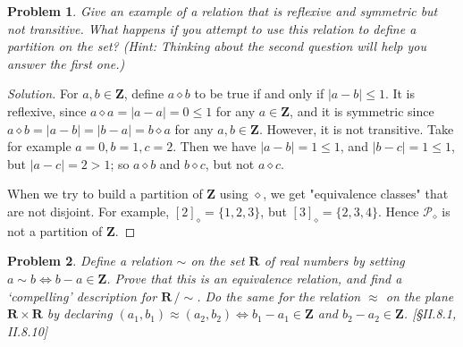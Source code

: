 \documentclass[fontsize=14pt]{scrartcl}
\newtheorem{problem-internal}{Problem}[subsection]
\newenvironment{problem}{
  \medskip
  \begin{problem-internal}
}{
  \end{problem-internal}
}
\newenvironment{solution}{
  \begin{proof}[Solution]
  \vspace{-8px}
  \setlength{\parskip}{4px}
  \setlength{\parindent}{0px}
}{
  \end{proof}
}
\newcommand{\abs}[1]{\left|#1\right|}
\begin{document}
\begin{problem}
Give an example of a relation that is reflexive and symmetric but not
transitive. What happens if you attempt to use this relation to define a
partition on the set? (Hint: Thinking about the second question will help you
answer the first one.)
\end{problem}

\begin{solution}
For $a,b\in \mathbf{Z}$, define $a\diamond b$ to be true if and only if
$\abs{a-b} \leq 1$. It is reflexive, since $a\diamond a = \abs{a-a} = 0 \leq 1$
for any $a\in \mathbf{Z}$, and it is symmetric since $a\diamond b = \abs{a-b} =
\abs{b-a} = b\diamond a$ for any $a,b\in \mathbf{Z}$. However, it is not
transitive. Take for example $a=0, b=1, c=2$.  Then we have $\abs{a-b} = 1\leq
1$, and $\abs{b-c} = 1\leq 1$, but $\abs{a-c} = 2 > 1$; so $a\diamond b$ and
$b\diamond c$, but not $a\diamond c$.

When we try to build a partition of $\mathbf{Z}$ using $\diamond$, we get
"equivalence classes" that are not disjoint. For example, $[2]_{\diamond} =
\{1,2,3\}$, but $[3]_{\diamond} = \{2,3,4\}$. Hence $\mathscr{P}_{\diamond}$ is
not a partition of $\mathbf{Z}$.
\end{solution}


\begin{problem}
Define a relation $\sim$ on the set $\mathbf{R}$ of real numbers by
setting $a\sim b\iff b-a\in\mathbf{Z}$. Prove that this is an equivalence
relation, and find a `compelling' description for $\mathbf{R}\,/\!\sim$. Do the
same for the relation $\approx$ on the plane $\mathbf{R}\times\mathbf{R}$ by
declaring $(a_1,b_1)\approx(a_2,b_2)\iff b_1-a_1\in\mathbf{Z}$ and
$b_2-a_2\in\mathbf{Z}$. [\S II.8.1, II.8.10]
\end{problem}
\end{document}
